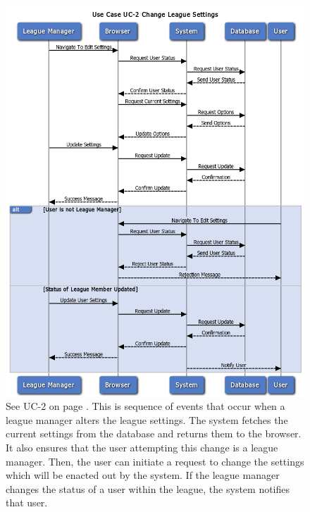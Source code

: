 \begin{figure}
\centering
\includegraphics[width=5.5in]{./Diagrams/SystemSequenceDiagrams/uc2.png}
\caption{See UC-2 on page \pageref{UC-2}. This is sequence of events that occur when a league manager alters the league settings. The system fetches the current settings from the database and returns them to the browser. It also ensures that the user attempting this change is a league manager. Then, the user can initiate a request to change the settings which will be enacted out by the system. If the league manager changes the status of a user within the league, the system notifies that user.}
\end{figure}

